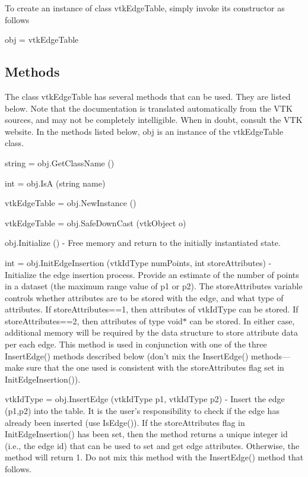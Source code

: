 To create an instance of class vtk\-Edge\-Table, simply invoke its constructor as follows \begin{DoxyVerb}  obj = vtkEdgeTable
\end{DoxyVerb}
 \hypertarget{vtkwidgets_vtkxyplotwidget_Methods}{}\subsection{Methods}\label{vtkwidgets_vtkxyplotwidget_Methods}
The class vtk\-Edge\-Table has several methods that can be used. They are listed below. Note that the documentation is translated automatically from the V\-T\-K sources, and may not be completely intelligible. When in doubt, consult the V\-T\-K website. In the methods listed below, {\ttfamily obj} is an instance of the vtk\-Edge\-Table class. 
\begin{DoxyItemize}
\item {\ttfamily string = obj.\-Get\-Class\-Name ()}  
\item {\ttfamily int = obj.\-Is\-A (string name)}  
\item {\ttfamily vtk\-Edge\-Table = obj.\-New\-Instance ()}  
\item {\ttfamily vtk\-Edge\-Table = obj.\-Safe\-Down\-Cast (vtk\-Object o)}  
\item {\ttfamily obj.\-Initialize ()} -\/ Free memory and return to the initially instantiated state.  
\item {\ttfamily int = obj.\-Init\-Edge\-Insertion (vtk\-Id\-Type num\-Points, int store\-Attributes)} -\/ Initialize the edge insertion process. Provide an estimate of the number of points in a dataset (the maximum range value of p1 or p2). The store\-Attributes variable controls whether attributes are to be stored with the edge, and what type of attributes. If store\-Attributes==1, then attributes of vtk\-Id\-Type can be stored. If store\-Attributes==2, then attributes of type void$\ast$ can be stored. In either case, additional memory will be required by the data structure to store attribute data per each edge. This method is used in conjunction with one of the three Insert\-Edge() methods described below (don't mix the Insert\-Edge() methods---make sure that the one used is consistent with the store\-Attributes flag set in Init\-Edge\-Insertion()).  
\item {\ttfamily vtk\-Id\-Type = obj.\-Insert\-Edge (vtk\-Id\-Type p1, vtk\-Id\-Type p2)} -\/ Insert the edge (p1,p2) into the table. It is the user's responsibility to check if the edge has already been inserted (use Is\-Edge()). If the store\-Attributes flag in Init\-Edge\-Insertion() has been set, then the method returns a unique integer id (i.\-e., the edge id) that can be used to set and get edge attributes. Otherwise, the method will return 1. Do not mix this method with the Insert\-Edge() method that follows.  

\end{DoxyItemize}
